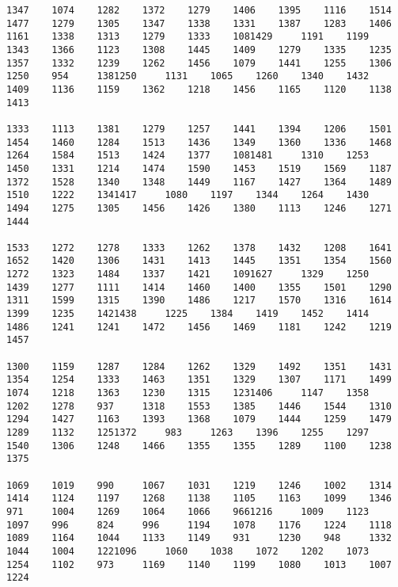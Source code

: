\begin{verbatim}
1347    1074    1282    1372    1279    1406    1395    1116    1514    1477    1279    1305    1347    1338    1331    1387    1283    1406    1161    1338    1313    1279    1333    1081429     1191    1199    1343    1366    1123    1308    1445    1409    1279    1335    1235    1357    1332    1239    1262    1456    1079    1441    1255    1306    1250    954     1381250     1131    1065    1260    1340    1432    1409    1136    1159    1362    1218    1456    1165    1120    1138    1413

1333    1113    1381    1279    1257    1441    1394    1206    1501    1454    1460    1284    1513    1436    1349    1360    1336    1468    1264    1584    1513    1424    1377    1081481     1310    1253    1450    1331    1214    1474    1590    1453    1519    1569    1187    1372    1528    1340    1348    1449    1167    1427    1364    1489    1510    1222    1341417     1080    1197    1344    1264    1430    1494    1275    1305    1456    1426    1380    1113    1246    1271    1444

1533    1272    1278    1333    1262    1378    1432    1208    1641    1652    1420    1306    1431    1413    1445    1351    1354    1560    1272    1323    1484    1337    1421    1091627     1329    1250    1439    1277    1111    1414    1460    1400    1355    1501    1290    1311    1599    1315    1390    1486    1217    1570    1316    1614    1399    1235    1421438     1225    1384    1419    1452    1414    1486    1241    1241    1472    1456    1469    1181    1242    1219    1457

1300    1159    1287    1284    1262    1329    1492    1351    1431    1354    1254    1333    1463    1351    1329    1307    1171    1499    1074    1218    1363    1230    1315    1231406     1147    1358    1202    1278    937     1318    1553    1385    1446    1544    1310    1294    1427    1163    1393    1368    1079    1444    1259    1479    1289    1132    1251372     983     1263    1396    1255    1297    1540    1306    1248    1466    1355    1355    1289    1100    1238    1375

1069    1019    990     1067    1031    1219    1246    1002    1314    1414    1124    1197    1268    1138    1105    1163    1099    1346    971     1004    1269    1064    1066    9661216     1009    1123    1097    996     824     996     1194    1078    1176    1224    1118    1089    1164    1044    1133    1149    931     1230    948     1332    1044    1004    1221096     1060    1038    1072    1202    1073    1254    1102    973     1169    1140    1199    1080    1013    1007    1224


\end{verbatim}
